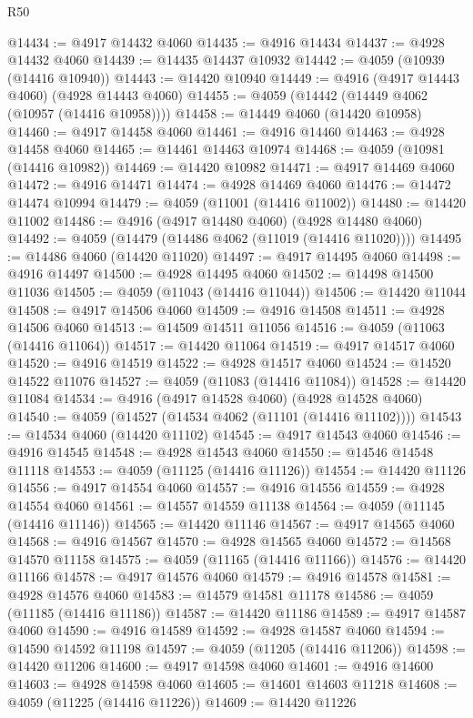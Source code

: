\begin{lexlean}{R50}
\begin{coremodule}
@14434 := @4917 @14432 @4060
@14435 := @4916 @14434
@14437 := @4928 @14432 @4060
@14439 := @14435 @14437 @10932
@14442 := @4059 (@10939 (@14416 @10940))
@14443 := @14420 @10940
@14449 := @4916 (@4917 @14443 @4060) (@4928 @14443 @4060)
@14455 := @4059 (@14442 (@14449 @4062 (@10957 (@14416 @10958))))
@14458 := @14449 @4060 (@14420 @10958)
@14460 := @4917 @14458 @4060
@14461 := @4916 @14460
@14463 := @4928 @14458 @4060
@14465 := @14461 @14463 @10974
@14468 := @4059 (@10981 (@14416 @10982))
@14469 := @14420 @10982
@14471 := @4917 @14469 @4060
@14472 := @4916 @14471
@14474 := @4928 @14469 @4060
@14476 := @14472 @14474 @10994
@14479 := @4059 (@11001 (@14416 @11002))
@14480 := @14420 @11002
@14486 := @4916 (@4917 @14480 @4060) (@4928 @14480 @4060)
@14492 := @4059 (@14479 (@14486 @4062 (@11019 (@14416 @11020))))
@14495 := @14486 @4060 (@14420 @11020)
@14497 := @4917 @14495 @4060
@14498 := @4916 @14497
@14500 := @4928 @14495 @4060
@14502 := @14498 @14500 @11036
@14505 := @4059 (@11043 (@14416 @11044))
@14506 := @14420 @11044
@14508 := @4917 @14506 @4060
@14509 := @4916 @14508
@14511 := @4928 @14506 @4060
@14513 := @14509 @14511 @11056
@14516 := @4059 (@11063 (@14416 @11064))
@14517 := @14420 @11064
@14519 := @4917 @14517 @4060
@14520 := @4916 @14519
@14522 := @4928 @14517 @4060
@14524 := @14520 @14522 @11076
@14527 := @4059 (@11083 (@14416 @11084))
@14528 := @14420 @11084
@14534 := @4916 (@4917 @14528 @4060) (@4928 @14528 @4060)
@14540 := @4059 (@14527 (@14534 @4062 (@11101 (@14416 @11102))))
@14543 := @14534 @4060 (@14420 @11102)
@14545 := @4917 @14543 @4060
@14546 := @4916 @14545
@14548 := @4928 @14543 @4060
@14550 := @14546 @14548 @11118
@14553 := @4059 (@11125 (@14416 @11126))
@14554 := @14420 @11126
@14556 := @4917 @14554 @4060
@14557 := @4916 @14556
@14559 := @4928 @14554 @4060
@14561 := @14557 @14559 @11138
@14564 := @4059 (@11145 (@14416 @11146))
@14565 := @14420 @11146
@14567 := @4917 @14565 @4060
@14568 := @4916 @14567
@14570 := @4928 @14565 @4060
@14572 := @14568 @14570 @11158
@14575 := @4059 (@11165 (@14416 @11166))
@14576 := @14420 @11166
@14578 := @4917 @14576 @4060
@14579 := @4916 @14578
@14581 := @4928 @14576 @4060
@14583 := @14579 @14581 @11178
@14586 := @4059 (@11185 (@14416 @11186))
@14587 := @14420 @11186
@14589 := @4917 @14587 @4060
@14590 := @4916 @14589
@14592 := @4928 @14587 @4060
@14594 := @14590 @14592 @11198
@14597 := @4059 (@11205 (@14416 @11206))
@14598 := @14420 @11206
@14600 := @4917 @14598 @4060
@14601 := @4916 @14600
@14603 := @4928 @14598 @4060
@14605 := @14601 @14603 @11218
@14608 := @4059 (@11225 (@14416 @11226))
@14609 := @14420 @11226

\end{coremodule}
\end{lexlean}
